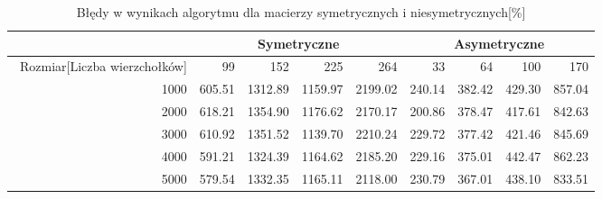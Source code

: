 \begin{table}
\begin{tabular}{|r|r|r|r|r|r|r|r|r|}
\hline
 & \multicolumn{4}{|c|}{Symetryczne} & \multicolumn{4}{|c|}{Asymetryczne} \\ \hline\
Rozmiar[Liczba wierzchołków] & 99 & 152 & 225 & 264 & 33 & 64 & 100 & 170 \\ \hline
1000 & 605.51 & 1312.89 & 1159.97 & 2199.02 & 240.14 & 382.42 & 429.30 & 857.04 \\
2000 & 618.21 & 1354.90 & 1176.62 & 2170.17 & 200.86 & 378.47 & 417.61 & 842.63 \\
3000 & 610.92 & 1351.52 & 1139.70 & 2210.24 & 229.72 & 377.42 & 421.46 & 845.69 \\
4000 & 591.21 & 1324.39 & 1164.62 & 2185.20 & 229.16 & 375.01 & 442.47 & 862.23 \\
5000 & 579.54 & 1332.35 & 1165.11 & 2118.00 & 230.79 & 367.01 & 438.10 & 833.51 \\ \hline
\end{tabular}
\caption{Błędy w wynikach algorytmu dla macierzy symetrycznych i niesymetrycznych[\%]}
\label{tab:error_AnStart}
\end{table}
